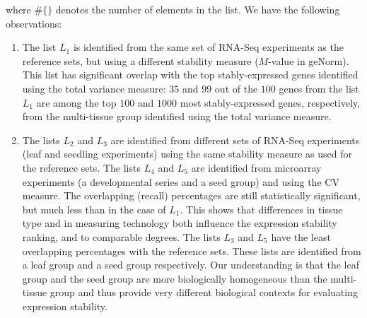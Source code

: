 \documentclass[letterpaper,12pt]{article}
\begin{document}
where $\#\{ \}$ denotes the number of elements in the list.
We have the following observations:
\begin{enumerate}
    \item
	The list $L_1$ is identified from the same set of RNA-Seq experiments as the
	reference sets, but using a different stability measure ($M$-value in
	geNorm). This list has significant overlap with the top
	stably-expressed genes identified using the total variance measure:
	$35$ and $99$ out of the $100$ genes from the list $L_1$ are among the
	top $100$ and $1000$ most stably-expressed genes, respectively, from the
	multi-tissue group identified using the total variance measure. 
    \item
	The lists $L_2$ and $L_3$ are identified from different sets of
	RNA-Seq experiments (leaf and seedling experiments) using the same
	stability measure as used for the reference sets. The lists $L_4$ and $L_5$ are
	identified from microarray experiments (a developmental series and a
	seed group) and using the CV measure. The overlapping (recall)
	percentages are still statistically significant, but much less than in
	the case of $L_1$.  This shows that differences in tissue type and in
	measuring technology both influence the expression stability ranking,
	and to comparable degrees. The lists $L_3$ and $L_5$ have the least
	overlapping percentages with the reference sets. These lists are
	identified from a leaf group and a seed group respectively.
	Our understanding is that the leaf group and the seed group are more
	biologically homogeneous than the multi-tissue group and thus provide
	very different biological contexts for evaluating expression stability.
\end{enumerate}


\end{document}
